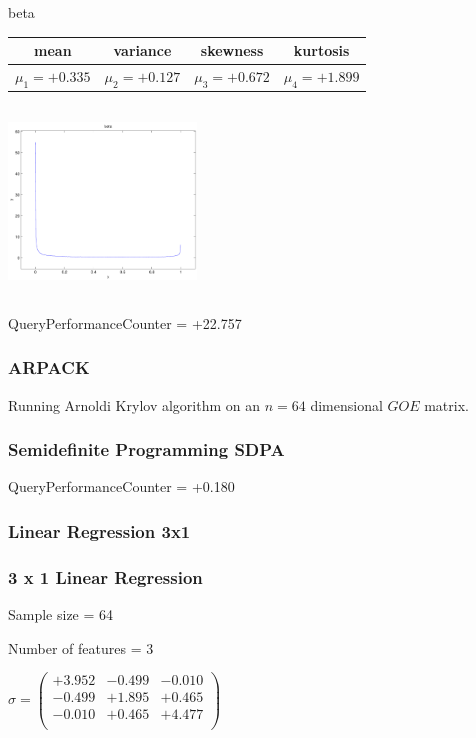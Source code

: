 \documentclass[12pt]{article}
\theoremstyle{definition}
\theoremstyle{remark}
\numberwithin{equation}{section}
\begin{document}
\newpage
beta \begin{tabular}{|c|c|c|c|}  mean & variance & skewness & kurtosis \\  \hline
$\mu_1 = +0.335$ & $\mu_2 = +0.127$ & $\mu_3 = +0.672$ & $\mu_4 =+1.899$ \\
\end{tabular}

\includegraphics[width=5cm,height=5cm]{beta.pdf}

QueryPerformanceCounter  =  +22.757
\subsubsection{ARPACK}
Running Arnoldi Krylov algorithm on an $n=64$ dimensional $GOE$ matrix.
\subsubsection{Semidefinite Programming SDPA}
QueryPerformanceCounter  =  +0.180
\subsubsection{Linear Regression 3x1}
\subsubsection{3 x 1 Linear Regression}
Sample size = 64

Number of features = 3

$\sigma = \left(
\begin{array}{
ccc}
+3.952 & -0.499 & -0.010 \\
-0.499 & +1.895 & +0.465 \\
-0.010 & +0.465 & +4.477 \\
\end{array}
\right)$
\end{document}
